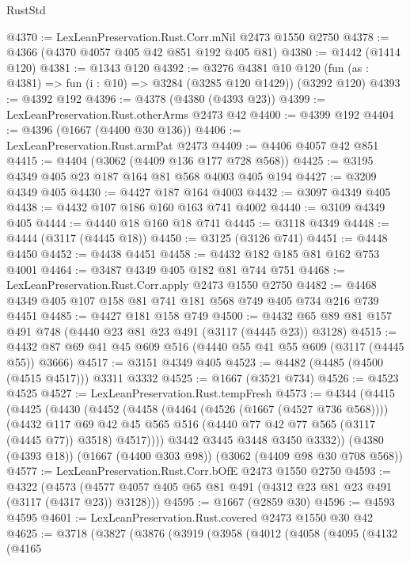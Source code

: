 \begin{lexlean}{RustStd}
\begin{coremodule}
@4370 := LexLeanPreservation.Rust.Corr.mNil @2473 @1550 @2750
@4378 := @4366 (@4370 @4057 @405 @42 @851 @192 @405 @81)
@4380 := @1442 (@1414 @120)
@4381 := @1343 @120
@4392 := @3276
    @4381
    @10
    @120
    (fun (as : @4381) => fun (i : @10) => @3284 (@3285 @120 @1429))
    (@3292 @120)
@4393 := @4392 @192
@4396 := @4378 (@4380 (@4393 @23))
@4399 := LexLeanPreservation.Rust.otherArms @2473 @42
@4400 := @4399 @192
@4404 := @4396 (@1667 (@4400 @30 @136))
@4406 := LexLeanPreservation.Rust.armPat @2473
@4409 := @4406 @4057 @42 @851
@4415 := @4404 (@3062 (@4409 @136 @177 @728 @568))
@4425 := @3195 @4349 @405 @23 @187 @164 @81 @568 @4003 @405 @194
@4427 := @3209 @4349 @405
@4430 := @4427 @187 @164 @4003
@4432 := @3097 @4349 @405
@4438 := @4432 @107 @186 @160 @163 @741 @4002
@4440 := @3109 @4349 @405
@4444 := @4440 @18 @160 @18 @741
@4445 := @3118 @4349
@4448 := @4444 (@3117 (@4445 @18))
@4450 := @3125 (@3126 @741)
@4451 := @4448 @4450
@4452 := @4438 @4451
@4458 := @4432 @182 @185 @81 @162 @753 @4001
@4464 := @3487 @4349 @405 @182 @81 @744 @751
@4468 := LexLeanPreservation.Rust.Corr.apply @2473 @1550 @2750
@4482 := @4468 @4349 @405 @107 @158 @81 @741 @181 @568 @749 @405 @734 @216 @739 @4451
@4485 := @4427 @181 @158 @749
@4500 := @4432 @65 @89 @81 @157 @491 @748 (@4440 @23 @81 @23 @491 (@3117 (@4445 @23)) @3128)
@4515 := @4432 @87 @69 @41 @45 @609 @516 (@4440 @55 @41 @55 @609 (@3117 (@4445 @55)) @3666)
@4517 := @3151 @4349 @405
@4523 := @4482 (@4485 (@4500 (@4515 @4517))) @3311 @3332
@4525 := @1667 (@3521 @734)
@4526 := @4523 @4525
@4527 := LexLeanPreservation.Rust.tempFresh
@4573 := @4344
    (@4415
      (@4425
        (@4430
          (@4452
            (@4458
              (@4464 (@4526 (@1667 (@4527 @736 @568))))
              (@4432
                @117
                @69
                @42
                @45
                @565
                @516
                (@4440 @77 @42 @77 @565 (@3117 (@4445 @77)) @3518)
                @4517))))
        @3442
        @3445
        @3448
        @3450
        @3332))
    (@4380 (@4393 @18))
    (@1667 (@4400 @303 @98))
    (@3062 (@4409 @98 @30 @708 @568))
@4577 := LexLeanPreservation.Rust.Corr.bOfE @2473 @1550 @2750
@4593 := @4322
    (@4573 (@4577 @4057 @405 @65 @81 @491 (@4312 @23 @81 @23 @491 (@3117 (@4317 @23)) @3128)))
@4595 := @1667 (@2859 @30)
@4596 := @4593 @4595
@4601 := LexLeanPreservation.Rust.covered @2473 @1550 @30 @42
@4625 := @3718
    (@3827
      (@3876
        (@3919
          (@3958
            (@4012
              (@4058
                (@4095
                  (@4132
                    (@4165

\end{coremodule}
\end{lexlean}
